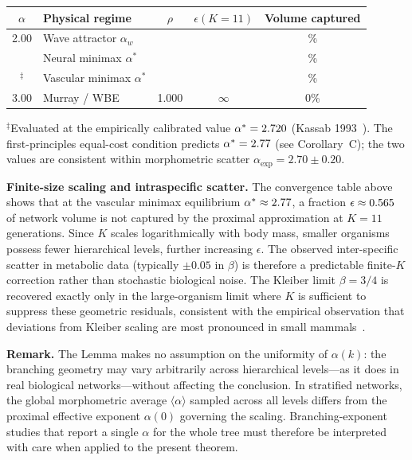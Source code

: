 \documentclass[11pt,a4paper]{article}
\theoremstyle{remark}
\begin{document}
\begin{center}
\small
\begin{tabular}{c p{3.8cm} c c c}
\toprule
$\alpha$ & Physical regime & $\rho$ & $\epsilon(K{=}11)$ & Volume captured \\
\midrule
2.00 & Wave attractor $\alpha_w$      & \rhoAlphaWave{} & \epsAlphaWave{} &
\volAlphaWave{}\% \\
\alphastarNeural{} & Neural minimax $\alpha^*$      & \rhoAlphaNeuralMinimax{} &
\epsAlphaNeuralMinimax{} & \volAlphaNeuralMinimax{}\% \\
\alphastar{}$^\ddagger$ & Vascular minimax $\alpha^*$    & \rhoAlphaVascMinimax{} &
\epsAlphaVascMinimax{} & \volAlphaVascMinimax{}\% \\
3.00 & Murray / WBE                   & 1.000 & $\infty$ & 0\%   \\
\bottomrule
\end{tabular}
\noindent\footnotesize{$^\ddagger$Evaluated at the empirically calibrated value $\alpha^* = 2.720{}$ (Kassab 1993~\cite{kassab1993}). The first-principles equal-cost condition predicts $\alpha^* = 2.77{}$ (see Corollary~C); the two values are consistent within morphometric scatter $\alpha_{\exp} = 2.70 \pm 0.20$.}\normalsize
\end{center}
\noindent\textbf{Finite-size scaling and intraspecific scatter.}
The convergence table above shows that at the vascular minimax equilibrium
$\alpha^* \approx 2.77{}$, a fraction $\epsilon \approx
0.565{}$ of network volume is not captured by the proximal
approximation at $K = 11$ generations. Since $K$ scales logarithmically
with body mass, smaller organisms possess fewer hierarchical levels, further
increasing $\epsilon$. The observed inter-specific scatter in metabolic data
(typically $\pm 0.05$ in $\beta$) is therefore a predictable finite-$K$
correction rather than stochastic biological noise. The Kleiber limit
$\beta = 3/4$ is recovered exactly only in the large-organism limit where
$K$ is sufficient to suppress these geometric residuals, consistent with the
empirical observation that deviations from Kleiber scaling are most
pronounced in small mammals~\cite{glazier2005, white2013}.

\vspace{0.4em}
\noindent\textbf{Remark.} The Lemma makes no assumption on the uniformity of $\alpha(k)$: the branching geometry may vary arbitrarily across hierarchical levels---as it does in real biological networks---without affecting the conclusion. In stratified networks, the global morphometric average $\langle \alpha \rangle$ sampled across all levels differs from the proximal effective exponent $\alpha(0)$ governing the scaling. Branching-exponent studies that report a single $\alpha$ for the whole tree must therefore be interpreted with care when applied to the present theorem.
\end{document}
